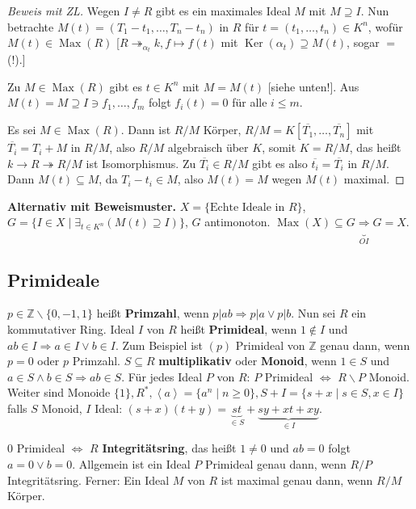 \documentclass[headsepline=true,DIV=11]{scrartcl}
\theoremstyle{definition}
\renewcommand{\bar}[1]{\overline{#1}}
\newcommand{\Max}{\operatorname{Max}}
\newcommand{\Ker}{\operatorname{Ker}}
\begin{document}
\begin{proof}[Beweis mit ZL]
  Wegen $I\neq R$ gibt es ein maximales Ideal $M$ mit $M\supseteq I$. Nun betrachte $M(t)=(T_1-t_1,\ldots,T_n-t_n)$ in $R$ für $t=(t_1,\ldots,t_n)\in
  K^n$, wofür $M(t)\in\Max(R)$ [$R \twoheadrightarrow_{\alpha_t} k, f\mapsto f(t)$ mit $\Ker(\alpha_t)\supseteq M(t)$, sogar $=$ (!).]

  Zu $M\in\Max(R)$ gibt es $t\in K^n$ mit $M=M(t)$ [siehe unten!]. Aus $M(t)=M\supseteq I\ni f_1,\ldots,f_m$ folgt $f_i(t)=0$ für alle $i\le m$.

  Es sei $M\in\Max(R)$. Dann ist $R/M$ Körper, $R/M=K[\bar{T_1},\ldots,\bar{T_n}]$ mit $\bar{T_i}=T_i+M$ in $R/M$, also $R/M$ algebraisch über $K$,
  somit $K=R/M$, das heißt $k\rightarrow R \twoheadrightarrow R/M$ ist Isomorphismus. Zu $\bar{T_i}\in R/M$ gibt es also $\bar{t_i}=\bar{T_i}$ in
  $R/M$. Dann $M(t)\subseteq M$, da $T_i-t_i\in M$, also $M(t)=M$ wegen $M(t)$ maximal.
\end{proof}

{\bf Alternativ mit Beweismuster.} $X=\{\mbox{Echte Ideale in }R\}$, $G=\{I\in X\mid\exists_{t\in K^n}(M(t)\supseteq I)\}$, $G$
antimonoton. $\Max(X)\subseteq G \underbrace{\Rightarrow}_{OI} G=X$.

\subsection{Primideale}


$p\in\mathbb{Z}\backslash\{0,-1,1\}$ heißt {\bf Primzahl}, wenn $p|ab\Rightarrow p|a \vee p|b$. Nun sei $R$ ein kommutativer Ring. Ideal $I$ von $R$
heißt {\bf Primideal}, wenn $1\not\in I$ und $ab\in I\Rightarrow a\in I \vee b\in I$. Zum Beispiel ist $(p)$ Primideal von $\mathbb{Z}$ genau dann,
wenn $p=0$ oder $p$ Primzahl. $S\subseteq R$ {\bf multiplikativ} oder {\bf Monoid}, wenn $1\in S$ und $a\in S\wedge b\in S\Rightarrow ab\in S$. Für
jedes Ideal $P$ von $R$: $P$ Primideal $\Leftrightarrow$ $R\backslash P$ Monoid. Weiter sind Monoide $\{1\},R^*,\left<a\right>=\{a^n\mid n\ge 0\},
S+I=\{s+x\mid s\in S,x\in I\}$ falls $S$ Monoid, $I$ Ideal: $(s+x)(t+y) = \underbrace{st}_{\in S}+\underbrace{sy+xt+xy}_{\in I}$.

$0$ Primideal $\Leftrightarrow$ $R$ {\bf Integritätsring}, das heißt $1\neq 0$ und $ab=0$ folgt $a=0\vee b=0$. Allgemein ist ein Ideal $P$ Primideal genau dann,
wenn $R/P$ Integritätsring. Ferner: Ein Ideal $M$ von $R$ ist maximal genau dann, wenn $R/M$ Körper.
\end{document}
